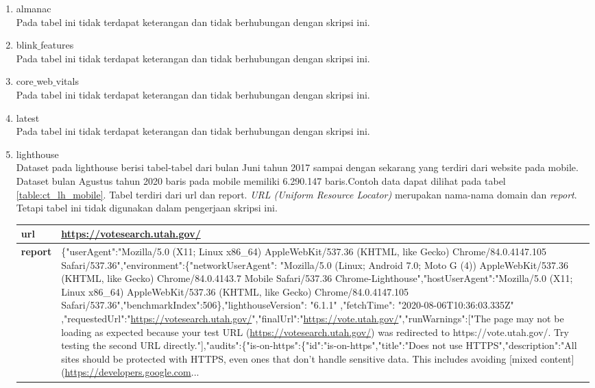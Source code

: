 \begin{enumerate}
	\item almanac\\
	Pada tabel ini tidak terdapat keterangan dan tidak berhubungan dengan skripsi ini.
	\item blink$\_$features\\
	Pada tabel ini tidak terdapat keterangan dan tidak berhubungan dengan skripsi ini.
	\item core$\_$web$\_$vitals\\
	Pada tabel ini tidak terdapat keterangan dan tidak berhubungan dengan skripsi ini.
	\item latest\\
	Pada tabel ini tidak terdapat keterangan dan tidak berhubungan dengan skripsi ini.
	\item lighthouse\\
	Dataset pada lighthouse berisi tabel-tabel dari bulan Juni tahun 2017 sampai dengan sekarang yang terdiri dari website pada mobile. Dataset bulan Agustus tahun 2020 baris pada mobile memiliki 6.290.147 baris.Contoh data dapat dilihat pada tabel \ref{table:ct_lh_mobile}. Tabel terdiri dari url dan report. \textit{URL (Uniform Resource Locator)} merupakan nama-nama domain dan \textit{report}. Tetapi tabel ini tidak digunakan dalam pengerjaan skripsi ini. 
	
	
	\begin{table}[H]
		\centering
		\begin{tabular*}{\textwidth}{|l|p{14.4cm}|}
			\hline
			\textbf{url} & \url{https://votesearch.utah.gov/}\\ 
			\hline
			\textbf{report} & \{"userAgent":"Mozilla/5.0 (X11; Linux x86\_64) AppleWebKit/537.36 (KHTML, like Gecko) Chrome/84.0.4147.105 Safari/537.36","environment":\{"networkUserAgent": "Mozilla/5.0 (Linux; Android 7.0; Moto G (4)) AppleWebKit/537.36 (KHTML, like Gecko) Chrome/84.0.4143.7 Mobile Safari/537.36 Chrome-Lighthouse","hostUserAgent":"Mozilla/5.0 (X11; Linux x86\_64) AppleWebKit/537.36 (KHTML, like Gecko) Chrome/84.0.4147.105 Safari/537.36","benchmarkIndex":506\},"lighthouseVersion": "6.1.1" ,"fetchTime": "2020-08-06T10:36:03.335Z" ,"requestedUrl":"\url{https://votesearch.utah.gov/}","finalUrl":"\url{https://vote.utah.gov/}","runWarnings":["The page may not be loading as expected because your test URL (\url{https://votesearch.utah.gov/}) was redirected to https://vote.utah.gov/. Try testing the second URL directly."],"audits":\{"is-on-https":\{"id":"is-on-https","title":"Does not use HTTPS","description":"All sites should be protected with HTTPS, even ones that don't handle sensitive data. This includes avoiding [mixed content](\url{https://developers.google.com}...\\
			\hline
			

\end{tabular*}
\end{table}
\end{enumerate}
